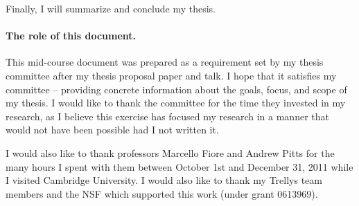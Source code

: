 Finally, I will summarize and conclude my thesis.

\paragraph{The role of this document.} This mid-course document
was prepared as a requirement set by my thesis committee after
my thesis proposal paper and talk. I hope that it satisfies my
committee -- providing concrete
information about the goals, focus, and scope of my thesis. I would like
to thank the committee for the time they invested in my research, as I believe this
exercise
has focused my research in a manner that would not have been possible had
I not written it.

I would also like to thank professors Marcello Fiore and Andrew Pitts for
the many hours I spent with them between October 1st and December 31, 2011
while I visited Cambridge University. I would also like to thank my Trellys
team members and the NSF which supported this work (under grant 0613969).

